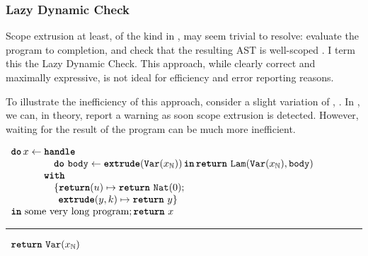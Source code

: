 \subsubsection{Lazy Dynamic Check}
Scope extrusion at least, of the kind in , may seem trivial to resolve: evaluate the program to completion, and check that the resulting AST is well-scoped \citep{kiselyov-14}. I term this the Lazy Dynamic Check. This approach, while clearly correct and maximally expressive, is not ideal for efficiency and error reporting reasons. 

To illustrate the inefficiency of this approach, consider a slight variation of , . In , we can, in theory, report a warning as soon scope extrusion is detected. However, waiting for the result of the program can be much more inefficient. 

\begin{code}
  \begin{efflst}
    $\begin{array}{l}
      \textbf{\texttt{do}} \,  x \leftarrow \textbf{\texttt{handle}} \\
      \quad \quad \quad \quad \,\, \texttt{\textbf{do}} \,\, {\texttt{body}} \leftarrow {\textbf{\texttt{extrude}}({\texttt{Var}(x_{\mathbb{N}})})} \, \textbf{\texttt{in}} \, {\texttt{\textbf{return}} \,\, {\texttt{Lam}(\texttt{Var}(x_{\mathbb{N}}), \texttt{body})}} \\
      \quad \quad \quad \,\, \textbf{\texttt{with}} \\
      \quad \quad \quad \quad \, \, \{ \textbf{\texttt{return}}(u) \mapsto {\texttt{\textbf{return}} \,\, {\texttt{Nat}(0)}}; \\
      \quad \quad \quad \quad \, \, \; \, \textbf{\texttt{extrude}}(y, k) \mapsto {\texttt{\textbf{return}} \,\, {y}}\}\\
      \textbf{\texttt{in}} \text{ some very long program}; \texttt{\textbf{return}} \,\, {x}
    \end{array}$

    \vspace{2mm} 
\textcolor{effComment}{\hrule height 0.2mm \relax}
\vspace{2mm} 

\textcolor{effComment}{$\begin{array}{l}\texttt{\textbf{return}} \,\, {\texttt{Var}(x_{\mathbb{N}})}\end{array}$}

  \end{efflst}
  \label{listing:efflang-lazy-scope-extrusion-inefficient}
  \end{code}

